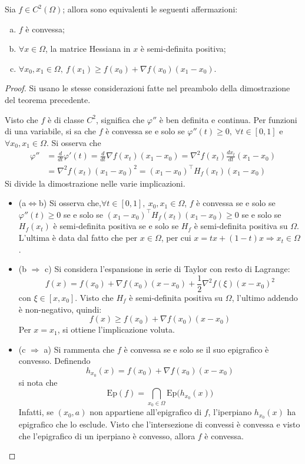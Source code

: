 \documentclass[11pt, a4paper]{scrartcl}
\theoremstyle{definition}
\numberwithin{esempio}{section}
\theoremstyle{definition}
\numberwithin{obs}{section}
\numberwithin{nota}{section}
\numberwithin{equation}{subsection}
\begin{document}
\begin{teorema}
	{}{}
	Sia $f \in C^2(\Omega )$; allora sono equivalenti le seguenti affermazioni:
	\begin{enumerate}[(a).]
		\item $f$ \`e convessa;
		\item $\forall x \in \Omega $, la matrice Hessiana in $x$ \`e semi-definita positiva;
		\item $\forall x_0,x_1 \in \Omega , \ f(x_1)\ge f(x_0) + \nabla f(x_0)(x_1-x_0)	$.
	\end{enumerate}
	\begin{proof}
		Si usano le stesse considerazioni fatte nel preambolo della dimostrazione del teorema precedente.

		Visto che $f$ \`e di classe $C^2$, significa che $\varphi ''$ \`e ben definita e continua.
		Per funzioni di una variabile, si sa che $f$ \`e convessa se e solo se $\varphi ''(t)\ge 0, \ \forall t \in [0,1]$ e $\forall x_0,x_1 \in \Omega $.
		Si osserva che
		\[
			\begin{split}
				\varphi '' &= \frac{d }{d t} \varphi '(t)=\frac{d }{d t} \nabla f(x_t)(x_1-x_0) = \nabla ^2 f(x_t) \frac{d x_t}{d t} (x_1-x_0) \\
				&= \nabla ^2 f(x_t) (x_1-x_0)^2 = (x_1-x_0)^\top H_f (x_t) (x_1-x_0)
			\end{split}
		\] 
		Si divide la dimostrazione nelle varie implicazioni.
		\begin{itemize}
			\item (a$\iff$b) Si osserva che,$\forall t \in [0,1], \ x_0,x_1 \in \Omega $, $f$ \`e convessa se e solo se $\varphi ''(t)\ge 0$ se e solo se $(x_1-x_0)^\top H_f(x_t)(x_1-x_0) \ge 0$ se e solo se $H_f(x_t) $ \`e semi-definita positiva se e solo se $H_f$ \`e semi-definita positiva su $\Omega $.
				L'ultima \`e data dal fatto che per $x \in \Omega $, per cui $x = tx + (1-t)x\Rightarrow x_t \in \Omega $.
			\item (b $\Rightarrow $ c) Si considera l'espansione in serie di Taylor con resto di Lagrange:
				\[
				f(x) = f(x_0) + \nabla f(x_0) (x-x_0) + \frac{1}{2} \nabla ^2 f(\xi ) (x-x_0)^2
				\] 
				con $\xi  \in [x,x_0]$.
				Visto che $H_f$ \`e semi-definita positiva su $\Omega $, l'ultimo addendo \`e non-negativo, quindi:
				\[
				f(x) \ge f(x_0) + \nabla f(x_0) (x-x_0)
				\] 
				Per $x=x_1$, si ottiene l'implicazione voluta.
			\item (c $\Rightarrow $ a) Si rammenta che $f$ \`e convessa se e solo se il suo epigrafico \`e convesso.
				Definendo
				\[
				h_{x_0} (x) = f(x_0) + \nabla f(x_0) (x-x_0)
				\] 
				si nota che
				\[
				\mathrm{Ep} (f) = \bigcap_{x_0\in \Omega } \mathrm{Ep} \big(h_{x_0} (x)\big)
				\] 
				Infatti, se $(x_0,a)$ non appartiene all'epigrafico di $f$, l'iperpiano $h_{x_0} (x)$ ha epigrafico che lo esclude.
				Visto che l'intersezione di convessi \`e convessa e visto che l'epigrafico di un iperpiano \`e convesso, allora $f$ \`e convessa.
		\end{itemize}
	\end{proof}
\end{teorema}
\end{document}
